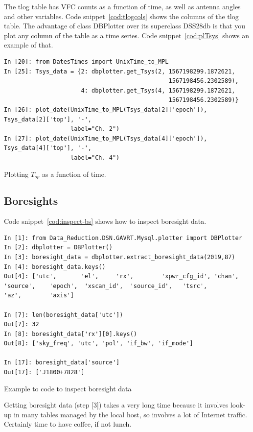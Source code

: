 \documentclass[letterpaper,11pt]{report}
\begin{document}
The {\ttfamily tlog} table has VFC counts as a function of time, as well as
antenna angles and other variables. Code snippet~\ref{cod:tlogcols} shows
the columns of the {\ttfamily tlog} table.  The advantage of class
{\ttfamily DBPlotter} over its superclass {\ttfamily DSS28db} is that you
plot any column of the table as a time series.  Code snippet~\ref{cod:plTsys}
shows an example of that.
\begin{code}[h!tb]
    \begin{center}
        {\scriptsize \begin{verbatim}
In [20]: from DatesTimes import UnixTime_to_MPL
In [25]: Tsys_data = {2: dbplotter.get_Tsys(2, 1567198299.1872621, 
                                               1567198456.2302589),
                      4: dbplotter.get_Tsys(4, 1567198299.1872621,
                                               1567198456.2302589)}
In [26]: plot_date(UnixTime_to_MPL(Tsys_data[2]['epoch']), Tsys_data[2]['top'], '-',
                   label="Ch. 2")
In [27]: plot_date(UnixTime_to_MPL(Tsys_data[4]['epoch']), Tsys_data[4]['top'], '-',
                   label="Ch. 4")
            \end{verbatim}
        }\caption{\label{cod:plTsys}Plotting $T_{op}$ as a function of time.}
    \end{center}
\end{code}


\subsection{Boresights}

Code snippet~\ref{cod:inspect-bs} shows how to inspect boresight data.
\begin{code}[h!tb]
    \begin{center}
        {\footnotesize \begin{verbatim}
In [1]: from Data_Reduction.DSN.GAVRT.Mysql.plotter import DBPlotter
In [2]: dbplotter = DBPlotter()
In [3]: boresight_data = dbplotter.extract_boresight_data(2019,87)
In [4]: boresight_data.keys()
Out[4]: ['utc',       'el',     'rx',        'xpwr_cfg_id', 'chan',
'source',    'epoch',  'xscan_id',  'source_id',   'tsrc',
'az',        'axis']

In [7]: len(boresight_data['utc'])
Out[7]: 32
In [8]: boresight_data['rx'][0].keys()
Out[8]: ['sky_freq', 'utc', 'pol', 'if_bw', 'if_mode']

In [17]: boresight_data['source']
Out[17]: ['J1800+7828']\end{verbatim}
        }\caption{\label{cod:inspect-bs}Example to code to inspect boresight
        data}
    \end{center}
\end{code}
Getting boresight data (step [3]) takes a very long time because it involves 
look-up in 
many tables managed by the local host, so involves a lot of Internet traffic. 
Certainly time to have coffee, if not lunch. 
\end{document}
